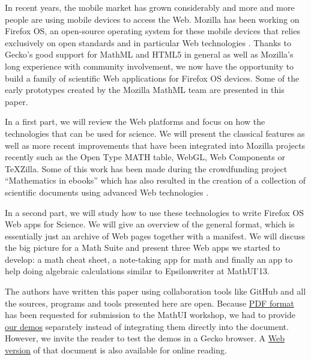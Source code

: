 In recent years, the mobile market has grown considerably and more and more
people are using mobile devices to access the Web. Mozilla has been working
on Firefox OS, an open-source operating system for these mobile devices that
relies exclusively on open standards and in particular Web technologies
\cite{MozillaFirefoxOS}. Thanks to
Gecko's good support for MathML and HTML5 in general as well as
Mozilla's long experience with community involvement, we now have the opportunity
to build a family of scientific Web applications for Firefox OS devices.
Some of the early prototypes created by the Mozilla MathML team are presented
in this paper.

In a first part, we will review the Web platforms and focus on how the
technologies that
can be used for science. We will present the classical features
as well as more recent improvements that have been integrated into Mozilla
projects recently such as the Open Type MATH table, WebGL, Web Components or
TeXZilla. Some of this work has been made during the crowdfunding project
``Mathematics in ebooks'' which has also resulted in the creation of a collection
of scientific documents using advanced Web technologies \cite{MathInEbooks}.

In a second
part, we will study how to use these technologies to write Firefox OS Web apps
for Science. We will give an overview of the general format, which is
essentially just an archive of Web pages together with a manifest. We will
discuss the big picture for a Math Suite and present three Web apps we started
to develop: a math cheat sheet, a note-taking app for math and finally an app
to help doing algebraic calculations similar to Epsilonwriter at MathUI'13.

The authors have written this paper using collaboration tools like GitHub and
all the sources, programs and tools presented here are open. Because 
\href{http://fred-wang.github.io/MathUI2014/paper/output/MathUI2014-MozillaMathML.pdf}{PDF format}
has been requested for submission to the MathUI workshop, we had to provide
\href{http://fred-wang.github.io/MathUI2014/demos/}{our demos} separately instead of integrating them directly into the document.
However, we invite the reader to test the demos in a Gecko browser. A 
\href{http://fred-wang.github.io/MathUI2014/paper/output/}{Web version} of that document is also available for online reading.
